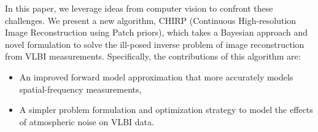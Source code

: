 
In this paper, we leverage ideas from computer vision to confront these challenges. We present a new algorithm, CHIRP (Continuous High-resolution Image Reconstruction using Patch priors), which takes a Bayesian approach and novel formulation to solve the ill-posed inverse problem of image reconstruction from VLBI measurements. Specifically, the contributions of this algorithm are:

\begin{itemize}[leftmargin=*]
	\item \vspace{-.1in} An improved forward model approximation that more accurately models spatial-frequency measurements,
	\item \vspace{-.1in} A simpler problem formulation and optimization strategy to model the effects of atmospheric noise on VLBI data. %
\end{itemize}

